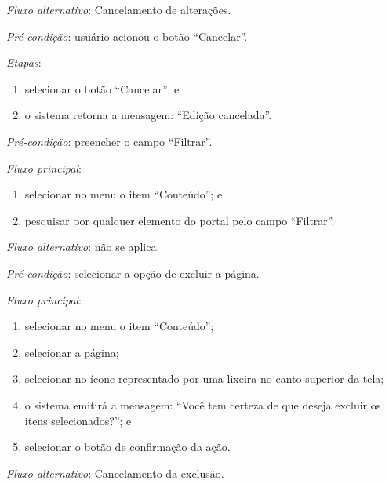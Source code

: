 \noindent \textit{Fluxo alternativo}: Cancelamento de alterações.

\noindent \textit{Pré-condição}: usuário acionou o botão ``Cancelar''.

\noindent \textit{Etapas}:

\begin{enumerate}
    \item selecionar o botão ``Cancelar''; e
    \item o sistema retorna a mensagem: ``Edição cancelada''.
\end{enumerate}


\vspace{0.7cm}

\noindent \textit{Pré-condição}: preencher o campo ``Filtrar''.

\noindent \textit{Fluxo principal}:

\begin{enumerate}
    \item selecionar no menu o item ``Conteúdo''; e
    \item pesquisar por qualquer elemento do portal pelo campo ``Filtrar''.
\end{enumerate}

\noindent \textit{Fluxo alternativo}: não se aplica.



\vspace{0.7cm}

\noindent \textit{Pré-condição}: selecionar a opção de excluir a página.

\noindent \textit{Fluxo principal}:

\begin{enumerate}
    \item selecionar no menu o item ``Conteúdo'';
    \item selecionar a página;
    \item selecionar no ícone representado por uma lixeira no canto superior da tela;
    \item o sistema emitirá a mensagem: ``Você tem certeza de que deseja excluir os itens selecionados?''; e
    \item selecionar o botão de confirmação da ação.
\end{enumerate}

\noindent \textit{Fluxo alternativo}: Cancelamento da exclusão.

